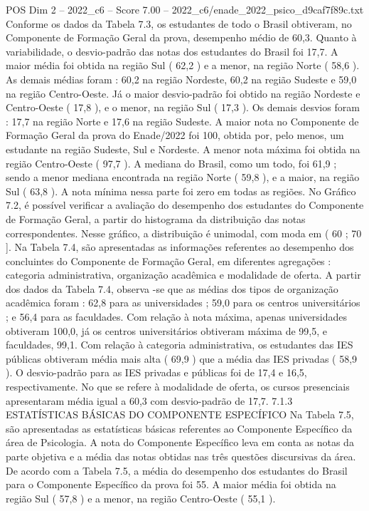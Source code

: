 \begin{textsample}{POS Dim 2 – 2022\_c6 – Score 7.00 – 2022\_c6/enade\_2022\_psico\_d9caf7f89c.txt}
Conforme os dados da Tabela 7.3, os estudantes de todo o Brasil obtiveram, no Componente de Formação Geral da prova, desempenho médio de 60,3.
Quanto à variabilidade, o desvio-padrão das notas dos estudantes do Brasil foi 17,7.
A maior média foi obtida na região Sul ( 62,2 ) e a menor, na região Norte ( 58,6 ).
As demais médias foram : 60,2 na região Nordeste, 60,2 na região Sudeste e 59,0 na região Centro-Oeste.
Já o maior desvio-padrão foi obtido na região Nordeste e Centro-Oeste ( 17,8 ), e o menor, na região Sul ( 17,3 ).
Os demais desvios foram : 17,7 na região Norte e 17,6 na região Sudeste.
A maior nota no Componente de Formação Geral da prova do Enade/2022 foi 100, obtida por, pelo menos, um estudante na região Sudeste, Sul e Nordeste.
A menor nota máxima foi obtida na região Centro-Oeste ( 97,7 ).
A mediana do Brasil, como um todo, foi 61,9 ; sendo a menor mediana encontrada na região Norte ( 59,8 ), e a maior, na região Sul ( 63,8 ).
A nota mínima nessa parte foi zero em todas as regiões.
No Gráfico 7.2, é possível verificar a avaliação do desempenho dos estudantes do Componente de Formação Geral, a partir do histograma da distribuição das notas correspondentes.
Nesse gráfico, a distribuição é unimodal, com moda em ( 60 ; 70 ].
Na Tabela 7.4, são apresentadas as informações referentes ao desempenho dos concluintes do Componente de Formação Geral, em diferentes agregações : categoria administrativa, organização acadêmica e modalidade de oferta.
A partir dos dados da Tabela 7.4, observa -se que as médias dos tipos de organização acadêmica foram : 62,8 para as universidades ; 59,0 para os centros universitários ; e 56,4 para as faculdades.
Com relação à nota máxima, apenas universidades obtiveram 100,0, já os centros universitários obtiveram máxima de 99,5, e faculdades, 99,1.
Com relação à categoria administrativa, os estudantes das IES públicas obtiveram média mais alta ( 69,9 ) que a média das IES privadas ( 58,9 ).
O desvio-padrão para as IES privadas e públicas foi de 17,4 e 16,5, respectivamente.
No que se refere à modalidade de oferta, os cursos presenciais apresentaram média igual a 60,3 com desvio-padrão de 17,7. 7.1.3 ESTATÍSTICAS BÁSICAS DO COMPONENTE ESPECÍFICO Na Tabela 7.5, são apresentadas as estatísticas básicas referentes ao Componente Específico da área de Psicologia.
A nota do Componente Específico leva em conta as notas da parte objetiva e a média das notas obtidas nas três questões discursivas da área.
De acordo com a Tabela 7.5, a média do desempenho dos estudantes do Brasil para o Componente Específico da prova foi 55.
A maior média foi obtida na região Sul ( 57,8 ) e a menor, na região Centro-Oeste ( 55,1 ).

\end{textsample}
